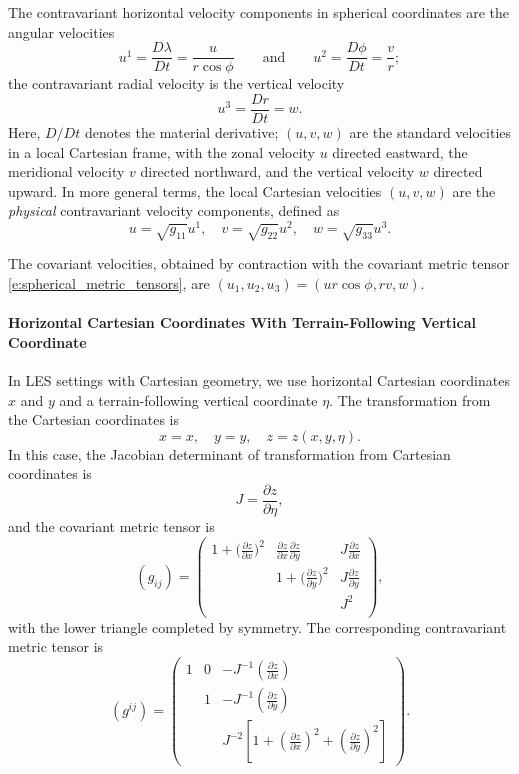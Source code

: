 \documentclass{report}
\begin{document}
The contravariant horizontal velocity components in spherical coordinates are the angular velocities 
\begin{equation}\label{e:angular_velocities}
u^1 = \frac{D\lambda}{Dt} = \frac{u}{r \cos\phi} \qquad \text{and} \qquad u^2 = \frac{D\phi}{Dt} = \frac{v}{r};
\end{equation}
the contravariant radial velocity is the vertical velocity 
\[
u^3 = \frac{Dr}{Dt} = w.
\]
Here, $D/Dt$ denotes the material derivative; $(u, v, w)$ are the standard velocities in a local Cartesian frame, with the zonal velocity $u$ directed eastward, the meridional velocity $v$ directed northward, and the vertical velocity $w$ directed upward. In more general terms, the local Cartesian velocities  $(u, v, w)$ are the \emph{physical} contravariant velocity components, defined as
\[
u = \sqrt{g_{11}} u^1, \quad v =\sqrt{g_{22}} u^2, \quad w =\sqrt{g_{33}} u^3.
\]

The covariant velocities, obtained by contraction with the covariant metric tensor \eqref{e:spherical_metric_tensors}, are $(u_1, u_2, u_3) = (u r \cos\phi, r v, w)$.

\paragraph{Horizontal Cartesian Coordinates With Terrain-Following Vertical Coordinate} In LES settings with Cartesian geometry, we use horizontal Cartesian coordinates $x$ and $y$ and a terrain-following vertical coordinate $\eta$. 
The transformation from the Cartesian coordinates is
\[
x = x, \quad y = y, \quad z = z(x, y, \eta).
\]
In this case, the Jacobian determinant of transformation from Cartesian coordinates is 
\[
J = \frac{\partial z}{\partial\eta},
\]
and the covariant metric tensor is \citep{Guerra16a}
\begin{equation}\label{e:Cartesian_terrain_cov_metric}
    (g_{ij}) = \left(
    \begin{matrix}
    1 + \big(\frac{\partial z}{\partial x}\big)^{2} & 
    \frac{\partial z}{\partial x} \frac{\partial z}{\partial y} & 
    J \frac{\partial z}{\partial x}  \\
    & 
    1 + \big(\frac{\partial z}{\partial y}\big)^{2} 
    & J \frac{\partial z}{\partial y}  \\
     &
     & 
     J^2\\
    \end{matrix}
    \right),
\end{equation}
with the lower triangle completed by symmetry. The corresponding contravariant metric tensor is
\begin{equation}
    (g^{ij}) = \left(
    \begin{matrix}
    1 & 0 & - J^{-1} \left( \frac{\partial z}{\partial x} \right) \\
      & 1 & - J^{-1} \left( \frac{\partial z}{\partial y} \right) \\
      & & J^{-2} 
      \left[ 1 + \left( \frac{\partial z}{\partial x} \right)^2 + \left( \frac{\partial z}{\partial y} \right)^2 \right]
    \end{matrix}
    \right).
\end{equation}
\end{document}
